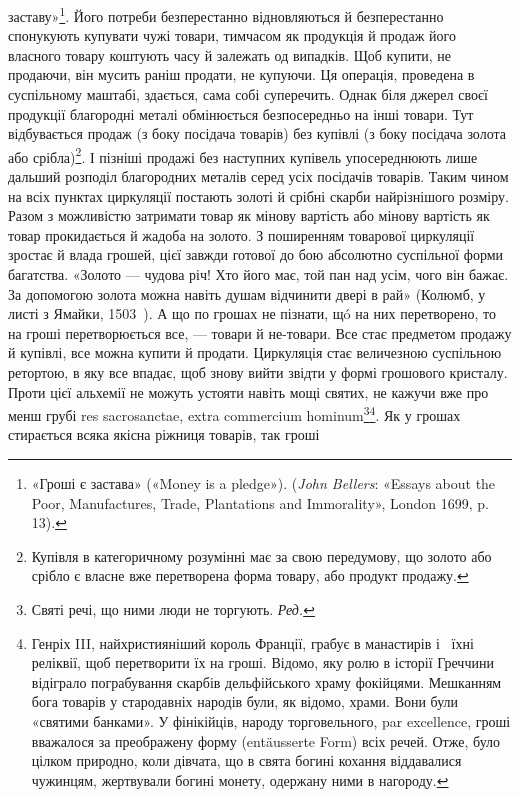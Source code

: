 \parcont{}  %
заставу»\footnote{
«Гроші є застава» («Money is a pledge»). (\emph{John Bellers}: «Essays
about the Poor, Manufactures, Trade, Plantations and Immorality», London
1699, p. 13).
}. Його потреби безперестанно відновляються й безперестанно
спонукують купувати чужі товари, тимчасом як продукція
й продаж його власного товару коштують часу й залежать
од випадків. Щоб купити, не продаючи, він мусить раніш продати,
не купуючи. Ця операція, проведена в суспільному маштабі,
здається, сама собі суперечить. Однак біля джерел своєї продукції
благородні металі обмінюється безпосередньо на інші товари.
Тут відбувається продаж (з боку посідача товарів) без купівлі
(з боку посідача золота або срібла)\footnote{
Купівля в категоричному розумінні має за свою передумову, що
золото або срібло є власне вже перетворена форма товару, або продукт
продажу.
}. І пізніші продажі без наступних
купівель упосереднюють лише дальший розподіл благородних
металів серед усіх посідачів товарів. Таким чином на
всіх пунктах циркуляції постають золоті й срібні скарби найрізнішого
розміру. Разом з можливістю затримати товар як
мінову вартість або мінову вартість як товар прокидається й
жадоба на золото. З поширенням товарової циркуляції зростає й
влада грошей, цієї завжди готової до бою абсолютно суспільної
форми багатства. «Золото — чудова річ! Хто його має, той пан
над усім, чого він бажає. За допомогою золота можна навіть
душам відчинити двері в рай» (Колюмб, у листі з Ямайки, 1503~).
А що по грошах не пізнати, щó на них перетворено, то на гроші
перетворюється все, — товари й не-товари. Все стає предметом
продажу й купівлі, все можна купити й продати. Циркуляція
стає величезною суспільною ретортою, в яку все впадає, щоб
знову вийти звідти у формі грошового кристалу. Проти цієї
альхемії не можуть устояти навіть мощі святих, не кажучи вже
про менш грубі res sacrosanctae, extra commercium hominum\footnote*{
Святі речі, що ними люди не торгують. \emph{Ред.}
}\footnote{
Генріх III, найхристияніший король Франції, грабує в манастирів
і~ їхні реліквії, щоб перетворити їх на гроші. Відомо, яку ролю
в історії Греччини відіграло пограбування скарбів дельфійського храму
фокійцями. Мешканням бога товарів у стародавніх народів були, як відомо,
храми. Вони були «святими банками». У фінікійців, народу торговельного,
par excellence, гроші вважалося за преображену форму (entäusserte
Form) всіх речей. Отже, було цілком природно, коли дівчата, що в
свята богині кохання віддавалися чужинцям, жертвували богині монету,
одержану ними в нагороду.
}. Як у грошах стирається всяка якісна ріжниця товарів, так гроші
